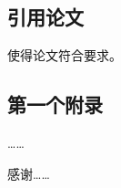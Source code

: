 \documentclass[bachelor]{seuthesis} %
\begin{document}
\begin{Main}
\section{引用论文}
使得论文符合要求\cite{Yao:2015ix}\cite{seucover}。

\end{Main} %



\begin{Appendix}
  \chapter{第一个附录}
  ……
\end{Appendix}

\begin{Acknowledgement}
感谢……
\end{Acknowledgement}

\newpage
\printindex %



%
%
\end{document}
